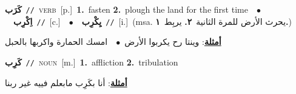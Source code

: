 \documentclass[10pt,a4paper,twoside]{article} %
\begin{document}
\begin{multicols}{2}
{\setlength\topsep{0pt}\textbf{\foreignlanguage{arabic}{كَرَب}}\ {\color{gray}\texttt{//}\color{black}}\ \textsc{verb}\ [p.]\ \textbf{1.}~fasten  \textbf{2.}~plough the land for the first time\ \ $\bullet$\ \ \setlength\topsep{0pt}\textbf{\foreignlanguage{arabic}{اِكْرِب}}\ {\color{gray}\texttt{//}\color{black}}\ [c.]\ \ $\bullet$\ \ \setlength\topsep{0pt}\textbf{\foreignlanguage{arabic}{يِكْرِب}}\ {\color{gray}\texttt{//}\color{black}}\ [i.]\ \color{gray}(msa. \foreignlanguage{arabic}{يحرث الأرض للمرة الثانية}~\foreignlanguage{arabic}{\textbf{٢.}}  \foreignlanguage{arabic}{يربِط}~\foreignlanguage{arabic}{\textbf{١.}})\color{black}\  \begin{flushright}\color{gray}\foreignlanguage{arabic}{\textbf{\underline{\foreignlanguage{arabic}{أمثلة}}}: وينتا رح يكربوا الأرض\ $\bullet$\ \  امسك الحمارة واكربها بالحبل}\end{flushright}\color{black}} \vspace{2mm}

{\setlength\topsep{0pt}\textbf{\foreignlanguage{arabic}{كَرِب}}\ {\color{gray}\texttt{//}\color{black}}\ \textsc{noun}\ [m.]\ \textbf{1.}~affliction  \textbf{2.}~tribulation\  \begin{flushright}\color{gray}\foreignlanguage{arabic}{\textbf{\underline{\foreignlanguage{arabic}{أمثلة}}}: أنا بكَرِب مابعلم فييه غير ربنا}\end{flushright}\color{black}} \vspace{2mm}


\end{multicols}
\end{document}
